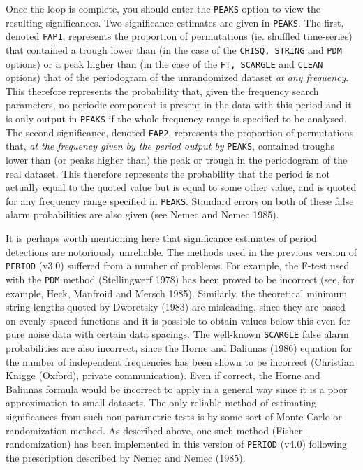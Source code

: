 \documentclass[twoside,11pt,noabs,nolof]{starlink}
\begin{document}
\begin{itemize}
Once the loop is complete, you should enter the \texttt{PEAKS} option to view the
resulting significances. Two significance estimates are given in \texttt{PEAKS}.
The first, denoted \texttt{FAP1}, represents the proportion of permutations (ie.
shuffled time-series) that contained a trough lower than (in the case of the
\texttt{CHISQ, STRING} and \texttt{PDM} options) or a peak higher than (in the case
of the \texttt{FT, SCARGLE} and \texttt{CLEAN} options) that of the periodogram of
the unrandomized dataset \emph{at any frequency}. This therefore represents the
probability that, given the frequency search parameters, no periodic component
is present in the data with this period and it is only output in \texttt{PEAKS} if
the whole frequency range is specified to be analysed. The second significance,
denoted \texttt{FAP2}, represents the proportion of permutations that, \emph{at the
frequency given by the period output by} \texttt{PEAKS}, contained troughs lower
than (or peaks higher than) the peak or trough in the periodogram of the real
dataset. This therefore represents the probability that the period is not
actually equal to the quoted value but is equal to some other value, and is
quoted for any frequency range specified in \texttt{PEAKS}. Standard errors on both
of these false alarm probabilities are also given (see Nemec and Nemec 1985).

It is perhaps worth mentioning here that significance estimates of period
detections are notoriously unreliable. The methods used in the previous version
of \texttt{PERIOD} (v3.0) suffered from a number of problems. For example, the
F-test used with the \texttt{PDM} method (Stellingwerf 1978) has been proved to be
incorrect (see, for example, Heck, Manfroid and Mersch 1985). Similarly, the
theoretical minimum string-lengths quoted by Dworetsky (1983) are misleading,
since they are based on evenly-spaced functions and it is possible to obtain
values below this even for pure noise data with certain data spacings. The
well-known \texttt{SCARGLE} false alarm probabilities are also incorrect, since
the Horne and Baliunas (1986) equation for the number of independent
frequencies has been shown to be incorrect (Christian Knigge (Oxford), private
communication). Even if correct, the Horne and Baliunas formula would be
incorrect to apply in a general way since it is a poor approximation to small
datasets. The only reliable method of estimating significances from such
non-parametric tests is by some sort of Monte Carlo or randomization method.
As described above, one such method (Fisher randomization) has been
implemented in this version of \texttt{PERIOD} (v4.0) following the prescription
described by Nemec and Nemec (1985).


\end{itemize}
\end{document}
